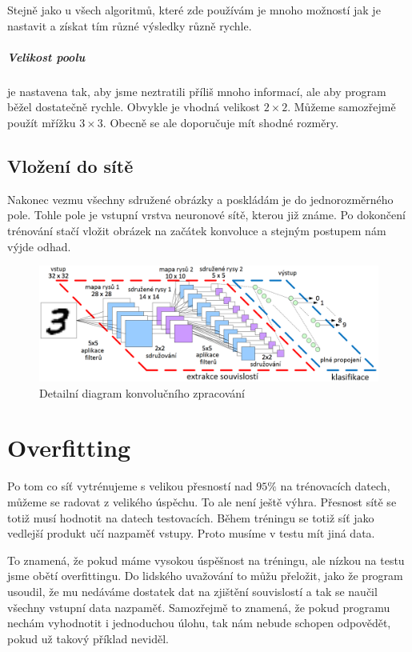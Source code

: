 \documentclass[12pt,a4paper]{report}
\begin{document}
Stejně jako u všech algoritmů, které zde používám je mnoho možností jak je nastavit a získat tím různé výsledky různě rychle.
\paragraph{Velikost poolu}
je nastavena tak, aby jsme neztratili příliš mnoho informací, ale aby program běžel dostatečně rychle. Obvykle je vhodná velikost $2\times2$. Můžeme samozřejmě použít mřížku $3\times3$. Obecně se ale doporučuje mít shodné rozměry.
\section{Vložení do sítě}
Nakonec vezmu všechny sdružené obrázky a poskládám je do jednorozměrného pole. Tohle pole je vstupní vrstva neuronové sítě, kterou již známe. Po dokončení trénování stačí vložit obrázek na začátek konvoluce a stejným postupem nám výjde odhad.

\begin{figure}[h]
	\centering
	\includegraphics[width=17cm]{images/convolution}
	\caption{Detailní diagram konvolučního zpracování}
\end{figure}

\chapter{Overfitting}
Po tom co síť vytrénujeme s velikou přesností nad $95\%$ na trénovacích datech, můžeme se radovat z velikého úspěchu. To ale není ještě výhra. Přesnost sítě se totiž musí hodnotit na datech testovacích. Během tréningu se totiž síť jako vedlejší produkt učí nazpaměť vstupy. Proto musíme v testu mít jiná data.

To znamená, že pokud máme vysokou úspěšnost na tréningu, ale nízkou na testu jsme obětí overfittingu. Do lidského uvažování to můžu přeložit, jako že program usoudil, že mu nedáváme dostatek dat na zjištění souvislostí a tak se naučil všechny vstupní data nazpaměť. Samozřejmě to znamená, že pokud programu nechám vyhodnotit i jednoduchou úlohu, tak nám nebude schopen odpovědět, pokud už takový příklad neviděl.
\end{document}
